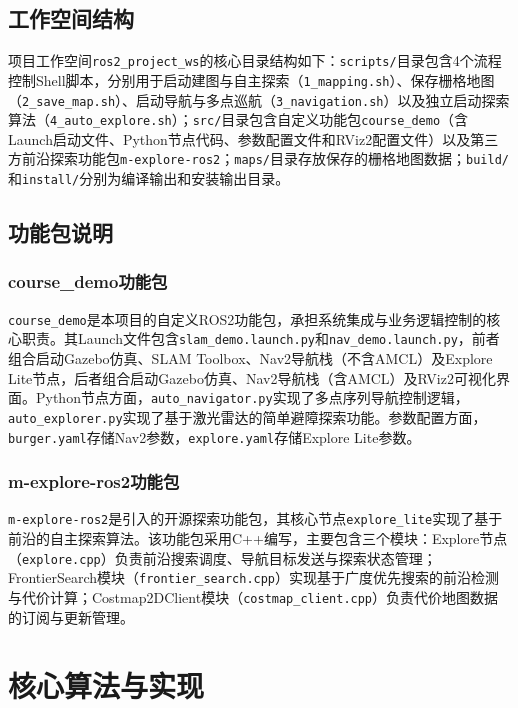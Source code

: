 \documentclass[a4paper,12pt]{article}
\begin{document}
\subsection{工作空间结构}

项目工作空间\texttt{ros2\_project\_ws}的核心目录结构如下：\texttt{scripts/}目录包含4个流程控制Shell脚本，分别用于启动建图与自主探索（\texttt{1\_mapping.sh}）、保存栅格地图（\texttt{2\_save\_map.sh}）、启动导航与多点巡航（\texttt{3\_navigation.sh}）以及独立启动探索算法（\texttt{4\_auto\_explore.sh}）；\texttt{src/}目录包含自定义功能包\texttt{course\_demo}（含Launch启动文件、Python节点代码、参数配置文件和RViz2配置文件）以及第三方前沿探索功能包\texttt{m-explore-ros2}；\texttt{maps/}目录存放保存的栅格地图数据；\texttt{build/}和\texttt{install/}分别为编译输出和安装输出目录。

\subsection{功能包说明}

\subsubsection{course\_demo功能包}

\texttt{course\_demo}是本项目的自定义ROS2功能包，承担系统集成与业务逻辑控制的核心职责。其Launch文件包含\texttt{slam\_demo.launch.py}和\texttt{nav\_demo.launch.py}，前者组合启动Gazebo仿真、SLAM Toolbox、Nav2导航栈（不含AMCL）及Explore Lite节点，后者组合启动Gazebo仿真、Nav2导航栈（含AMCL）及RViz2可视化界面。Python节点方面，\texttt{auto\_navigator.py}实现了多点序列导航控制逻辑，\texttt{auto\_explorer.py}实现了基于激光雷达的简单避障探索功能。参数配置方面，\texttt{burger.yaml}存储Nav2参数，\texttt{explore.yaml}存储Explore Lite参数。

\subsubsection{m-explore-ros2功能包}

\texttt{m-explore-ros2}是引入的开源探索功能包，其核心节点\texttt{explore\_lite}实现了基于前沿的自主探索算法。该功能包采用C++编写，主要包含三个模块：Explore节点（\texttt{explore.cpp}）负责前沿搜索调度、导航目标发送与探索状态管理；FrontierSearch模块（\texttt{frontier\_search.cpp}）实现基于广度优先搜索的前沿检测与代价计算；Costmap2DClient模块（\texttt{costmap\_client.cpp}）负责代价地图数据的订阅与更新管理。

\section{核心算法与实现}
\end{document}

